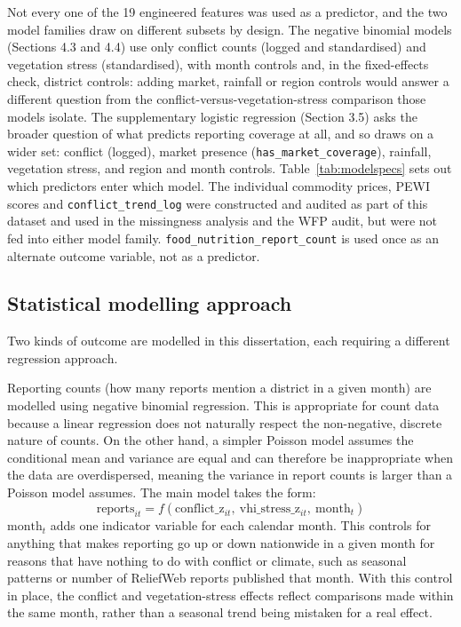 \documentclass[12pt,a4paper]{article}
\begin{document}
Not every one of the 19 engineered features was used as a predictor, and the two model families draw on different subsets by design. The negative binomial models (Sections 4.3 and 4.4) use only conflict counts (logged and standardised) and vegetation stress (standardised), with month controls and, in the fixed-effects check, district controls: adding market, rainfall or region controls would answer a different question from the conflict-versus-vegetation-stress comparison those models isolate. The supplementary logistic regression (Section 3.5) asks the broader question of what predicts reporting coverage at all, and so draws on a wider set: conflict (logged), market presence (\texttt{has\_market\_coverage}), rainfall, vegetation stress, and region and month controls. Table~\ref{tab:modelspecs} sets out which predictors enter which model. The individual commodity prices, PEWI scores and \texttt{conflict\_trend\_log} were constructed and audited as part of this dataset and used in the missingness analysis and the WFP audit, but were not fed into either model family. \texttt{food\_nutrition\_report\_count} is used once as an alternate outcome variable, not as a predictor.

\subsection{Statistical modelling approach}

Two kinds of outcome are modelled in this dissertation, each requiring a different regression approach.

Reporting counts (how many reports mention a district in a given month) are modelled using negative binomial regression. This is appropriate for count data because a linear regression does not naturally respect the non-negative, discrete nature of counts. On the other hand, a simpler Poisson model assumes the conditional mean and variance are equal and can therefore be inappropriate when the data are overdispersed, meaning the variance in report counts is larger than a Poisson model assumes. The main model takes the form:
\[
\text{reports}_{it} = f(\text{conflict\_z}_{it},\ \text{vhi\_stress\_z}_{it},\ \text{month}_t)
\]
$\text{month}_t$ adds one indicator variable for each calendar month. This controls for anything that makes reporting go up or down nationwide in a given month for reasons that have nothing to do with conflict or climate, such as seasonal patterns or number of ReliefWeb reports published that month. With this control in place, the conflict and vegetation-stress effects reflect comparisons made within the same month, rather than a seasonal trend being mistaken for a real effect.
\end{document}
